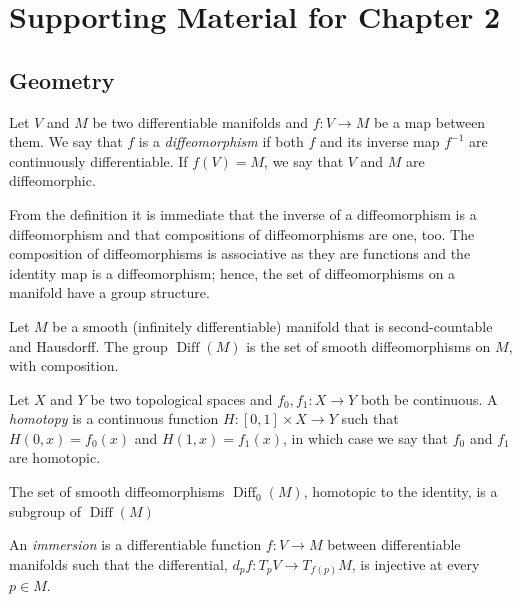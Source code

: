 \chapter{Supporting Material for Chapter 2}\label{appendix-2}
\section{Geometry}
\begin{definition}[Diffeomorphism]
Let $V$ and $M$ be two differentiable manifolds and $f:V\to M$ be a map between them. We say that $f$ is a \emph{diffeomorphism} if both $f$ and its inverse map $f^{-1}$ are continuously differentiable. If $f(V) = M$, we say that $V$ and $M$ are diffeomorphic. 
\end{definition}

\noindent From the definition it is immediate that the inverse of a diffeomorphism is a diffeomorphism and that compositions of diffeomorphisms are one, too. The composition of diffeomorphisms is associative as they are functions and the identity map is a diffeomorphism; hence, the set of diffeomorphisms on a manifold have a group structure.

\begin{definition}
Let $M$ be a smooth (infinitely differentiable) manifold that is second-countable and Hausdorff. The group $\operatorname{Diff}(M)$ is the set of smooth diffeomorphisms on $M$, with composition.
\end{definition}

\begin{definition}[Homotopy]
Let $X$ and $Y$ be two topological spaces and $f_0, f_1:X\to Y$ both be continuous. A \emph{homotopy} is a continuous function $H: [0,1]\times X \to Y$ such that $H(0,x)=f_0(x)$ and $H(1,x)=f_1(x)$, in which case we say that $f_0$ and $f_1$ are homotopic.
\end{definition}

\begin{remark}
The set of smooth diffeomorphisms  $\operatorname{Diff}_0(M)$, homotopic to the identity, is a subgroup of $\operatorname{Diff}(M)$
\end{remark}

\begin{definition}[Immersion]
An \emph{immersion} is a differentiable function $f:V \to M$ between differentiable manifolds such that the differential, $d_pf: T_pV \to T_{f(p)}M$, is injective at every $p\in M$.
\end{definition}

